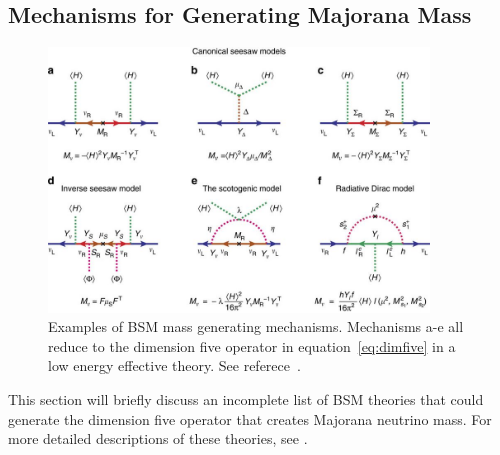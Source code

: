 \documentclass[/main.tex]{subfiles}
\begin{document}
\subsection{Mechanisms for Generating Majorana Mass}
\begin{figure}[t]
  \centering
  \includegraphics[width=0.9\textwidth]{dim5operator}
  \caption[Examples of Majorana Mass Generating Mechanisms]{\label{fig:dimfive}
    Examples of BSM mass generating mechanisms. Mechanisms a-e all reduce to the dimension five operator in equation~\ref{eq:dimfive} in a low energy effective theory. See referece~\cite{Ohlsson2014}.
  }
\end{figure}
This section will briefly discuss an incomplete list of BSM theories that could generate the dimension five operator that creates Majorana neutrino mass.
For more detailed descriptions of these theories, see \cite{Rodejohann2015, Perez2015}.
\end{document}
